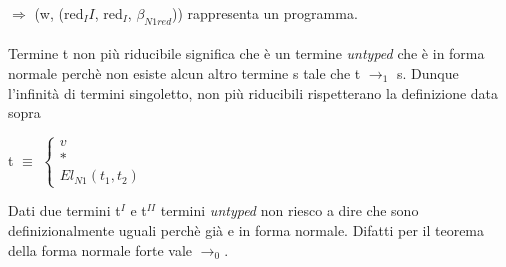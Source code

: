 \begin{prooftree}
\end{prooftree}
\noindent
 $\Rightarrow$ (w, (red$_II$, red$_I$, $\beta_{N1red}$)) rappresenta un programma.\\\\
\noindent
Termine t non pi\`u riducibile significa che \`e un termine \textit{untyped} che \`e in forma normale perch\`e non esiste alcun altro termine s tale che t $\rightarrow_1$ s. Dunque l'infinit\`a di termini singoletto, non pi\`u riducibili rispetterano la definizione data sopra\\
\begin{center}
t $\equiv$
$
\begin{cases}
v \\
\ast \\
El_{N1}(t_1, t_2)
\end{cases}
$
\end{center}
\noindent Dati due termini t$^I$ e t$^{II}$ termini \textit{untyped} non riesco a dire che sono definizionalmente uguali perch\`e gi\`a e in forma normale. Difatti  per il teorema della forma normale forte vale $\rightarrow_0$.






















